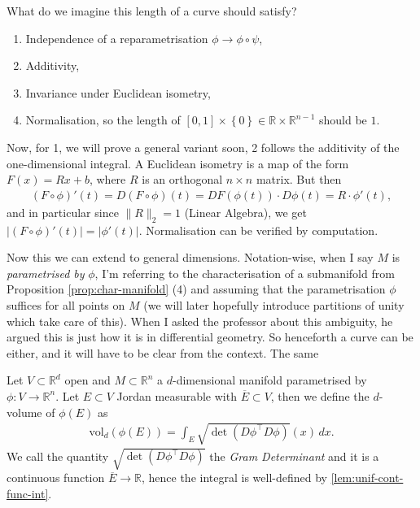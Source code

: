 What do we imagine this length of a curve should satisfy?
\begin{enumerate}
	\item Independence of a reparametrisation $\phi \to \phi \circ \psi$,
	\item Additivity,
	\item Invariance under Euclidean isometry,
	\item Normalisation, so the length of $[0,1] \times \left\{ 0 \right\} \in \mathbb{R} \times \mathbb{R}^{n-1}$ should be $1$.
\end{enumerate}
Now, for 1, we will prove a general variant soon, 2 follows the additivity of the one-dimensional integral. A Euclidean isometry is a map of the form $F(x) = Rx + b$, where $R$ is an orthogonal $n \times n$ matrix. But then
\begin{align*}
	(F \circ \phi)'(t) = D(F \circ \phi)(t) = DF(\phi(t)) \cdot D\phi(t) = R \cdot \phi'(t),
\end{align*}
and in particular since $\lVert R \rVert_{2} = 1$ (Linear Algebra), we get $\left| (F \circ \phi)'(t) \right| = \left| \phi'(t) \right|$. Normalisation can be verified by computation.

Now this we can extend to general dimensions. Notation-wise, when I say $M$ is \textit{parametrised by} $\phi$, I'm referring to the characterisation of a submanifold from Proposition \ref{prop:char-manifold} (4) and assuming that the parametrisation $\phi$ suffices for all points on $M$ (we will later hopefully introduce partitions of unity which take care of this). When I asked the professor about this ambiguity, he argued this is just how it is in differential geometry. So henceforth a curve can be either, and it will have to be clear from the context. The same 

\begin{definition}\label{def:d-vol}
	Let $V \subset \mathbb{R}^{d}$ open and $M \subset \mathbb{R}^{n}$ a $d$-dimensional manifold parametrised by $\phi: V \to \mathbb{R}^{n}$. Let $E \subset V$ Jordan measurable with $\overline{ E } \subset V$, then we define the $d$-volume of $\phi(E)$ as
	\begin{align*}
		\text{vol}_{d}(\phi(E)) = \int_{E} \sqrt{ \det (D \phi^\top D \phi)}(x) \, dx.
	\end{align*}
	We call the quantity $\sqrt{\det (D\phi^\top D \phi)}$ the \textit{Gram Determinant} and it is a continuous function $\overline{ E }  \to \mathbb{R}$, hence the integral is well-defined by \ref{lem:unif-cont-func-int}.
\end{definition}

